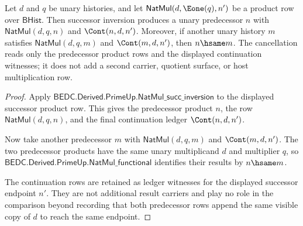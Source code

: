 \begin{theorem}
\label{thm:mulup-successor-cancellation-boundary}
Let $d$ and $q$ be unary histories, and let
$\mathsf{NatMul}(d,\Eone(q),n')$ be a product row over $\mathsf{BHist}$. Then
successor inversion produces a unary predecessor $n$ with
$\mathsf{NatMul}(d,q,n)$ and $\Cont(n,d,n')$. Moreover, if another unary
history $m$ satisfies $\mathsf{NatMul}(d,q,m)$ and $\Cont(m,d,n')$, then
$n\hsame m$. The cancellation reads only the predecessor product rows and the
displayed continuation witnesses; it does not add a second carrier, quotient
surface, or host multiplication row.
\end{theorem}
\begin{proof}
Apply $\mathsf{BEDC.Derived.PrimeUp.NatMul\_succ\_inversion}$ to the displayed
successor product row. This gives the predecessor product $n$, the row
$\mathsf{NatMul}(d,q,n)$, and the final continuation ledger $\Cont(n,d,n')$.

Now take another predecessor $m$ with $\mathsf{NatMul}(d,q,m)$ and
$\Cont(m,d,n')$. The two predecessor products have the same unary multiplicand
$d$ and multiplier $q$, so
$\mathsf{BEDC.Derived.PrimeUp.NatMul\_functional}$ identifies their results by
$n\hsame m$.

The continuation rows are retained as ledger witnesses for the displayed
successor endpoint $n'$. They are not additional result carriers and play no
role in the comparison beyond recording that both predecessor rows append the
same visible copy of $d$ to reach the same endpoint.
\end{proof}

